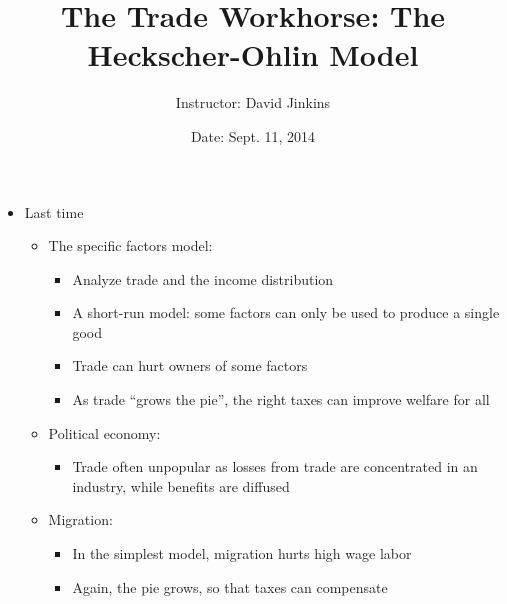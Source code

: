 \documentclass[ignorenonframetext,]{beamer}
\title{The Trade Workhorse: The Heckscher-Ohlin Model}
\author{Instructor: David Jinkins}
\date{Date: Sept. 11, 2014}
\begin{document}
\frame{\titlepage}

\begin{frame}
\begin{itemize}
\itemsep1pt\parskip0pt
\item
  Last time

  \begin{itemize}
  \itemsep1pt\parskip0pt
  \item The specific factors model:
      \begin{itemize}
          \item Analyze trade and the income distribution
          \item A short-run model: some factors can only be used to produce a single good
          \item Trade can hurt owners of some factors
          \item As trade ``grows the pie'', the right taxes can improve welfare for all
      \end{itemize}
      \item Political economy:
      \begin{itemize}
          \item Trade often unpopular as losses from trade are concentrated in an industry, while benefits are diffused
      \end{itemize}
  \item Migration:
      \begin{itemize}
          \item In the simplest model, migration hurts high wage labor
          \item Again, the pie grows, so that taxes can compensate
      \end{itemize}
  \end{itemize}
\end{itemize}

\end{frame}
\end{document}

